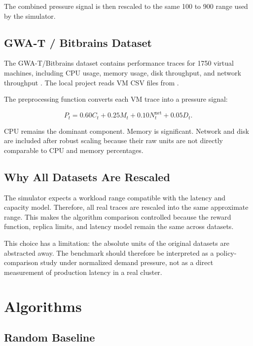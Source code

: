 \documentclass{rapportINPTCLOUD}
\newcommand{\pathcode}[1]{\texttt{\detokenize{#1}}}
\begin{document}
The combined pressure signal is then rescaled to the same 100 to 900 range used by the simulator.

\section{GWA-T / Bitbrains Dataset}

The GWA-T/Bitbrains dataset contains performance traces for 1750 virtual machines, including CPU usage, memory usage, disk throughput, and network throughput \cite{bitbrains2015}. The local project reads VM CSV files from \pathcode{data/gwat}.

The preprocessing function converts each VM trace into a pressure signal:

\begin{equation}
P_t =
0.60 C_t
+ 0.25 M_t
+ 0.10 N_t^{\text{net}}
+ 0.05 D_t.
\label{eq:gwat}
\end{equation}

CPU remains the dominant component. Memory is significant. Network and disk are included after robust scaling because their raw units are not directly comparable to CPU and memory percentages.

\section{Why All Datasets Are Rescaled}

The simulator expects a workload range compatible with the latency and capacity model. Therefore, all real traces are rescaled into the same approximate range. This makes the algorithm comparison controlled because the reward function, replica limits, and latency model remain the same across datasets.

This choice has a limitation: the absolute units of the original datasets are abstracted away. The benchmark should therefore be interpreted as a policy-comparison study under normalized demand pressure, not as a direct measurement of production latency in a real cluster.

\chapter{Algorithms}
\label{chap:algorithms}

\section{Random Baseline}
\end{document}
